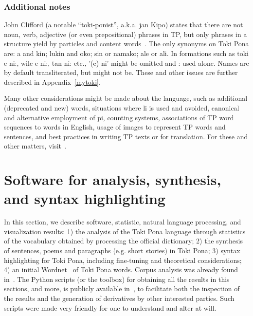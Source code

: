 
\subsubsection{Additional notes}\label{sec:add}
John Clifford (a notable ``toki-ponist'', a.k.a. jan Kipo)
states that there are not noun, verb, adjective (or even prepositional)
phrases in TP, but only phrases in a structure
yield by particles and content words~\cite{janKipo}.
The only synonyms on Toki Pona are:
a and kin; lukin and oko; sin or namako;
ale or ali.
In formations such as
toki e ni:, wile e ni:, tan ni: etc.,
'(e) ni' might be omitted and : used alone.
Names are by default transliterated,
but might not be.
These and other issues are further described in Appendix~\ref{mytoki}.

Many other considerations might be made about the language,
such as additional (deprecated and new) words,
situations where li is used and avoided,
canonical and alternative employment of pi,
counting systems,
associations of TP word sequences to words in English,
usage of images to represent TP words and sentences,
and best practices in writing TP texts or for translation.
For these and other matters, visit~\cite{tpLang,kama,tp4,gdoc}.

\section{Software for analysis, synthesis, and syntax highlighting}\label{hacks}
In this section,
we describe software, statistic, natural language processing,
and visualization results:
1)
the analysis of the Toki Pona language through statistics
of the vocabulary obtained by processing the official dictionary;
2)
the synthesis of sentences, poems and paragraphs (e.g. short stories)
in Toki Pona;
3)
syntax highlighting for Toki Pona,
including fine-tuning and theoretical
considerations;
4)
an initial Wordnet~\cite{wordnet} of
Toki Pona words.
Corpus analysis was already found in~\cite{corpus}.
The Python scripts (or the toolbox)
for obtaining all the results in this sections,
and more, is publicly available in~\cite{tokipona},
to facilitate both the inspection of the results and the
generation of derivatives by other interested parties.
Such scripts were made very friendly for one to understand and alter
at will.


